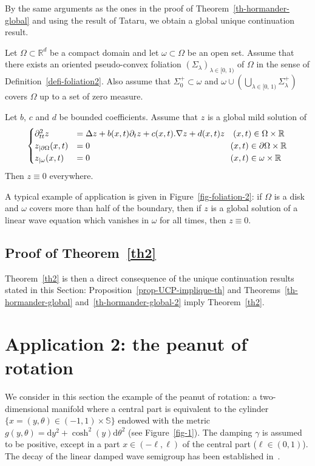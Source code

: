 \documentclass[AHL,Unicode,longabstracts]{cedram}
\newcommand{\RR}{\mathbb{R}}
\renewcommand{\SS}{\mathbb{S}}
\newcommand{\drm}{\mathrm{d}}
\newcommand{\grad}{\nabla}
\begin{document}
By the same arguments as the ones in the proof of Theorem~\ref{th-hormander-global} and using the result of Tataru, we obtain a global unique continuation result.

\begin{theo}\label{th-hormander-global-2}
Let $\Omega\subset\RR^d$ be a compact domain and let $\omega\subset\Omega$ be an open set. Assume that there exists an oriented pseudo-convex foliation $(\Sigma_\lambda)_{\lambda\in[0,\,1)}$ of $\Omega$ in the sense of Definition~\ref{defi-foliation2}. Also assume that $\Sigma_0^+\subset
\omega$ and $\omega\cup\left(\bigcup_{\lambda\in[0,\,1)} \Sigma_\lambda^+\right)$ covers $\Omega$ up to a set of zero measure.

Let $b$, $c$ and $d$ be bounded coefficients. Assume that $z$ is a global mild solution of
\[
\begin{cases}
\partial^2_{tt}z &=\Delta z + b(x,t)\partial_t z+c(x,t).\grad z+d(x,t)z\quad(x,t)\in\Omega\times \RR\\
z_{|\partial\Omega}(x,t)&=0 \mkern298mu (x,t)\in\partial\Omega\times\RR\\
z_{|\omega}(x,t)&=0 \mkern298mu(x,t)\in\omega\times\RR
\end{cases}
\]
Then $z\equiv 0$ everywhere.
\end{theo}

A typical example of application is given in Figure~\ref{fig-foliation-2}: if $\Omega$ is a disk and $\omega$ covers more than half of the boundary, then if $z$ is a global solution of a linear wave equation which vanishes in $\omega$ for all times, then $z\equiv 0$.

\subsection{Proof of Theorem~\ref{th2}}

Theorem~\ref{th2} is then a direct consequence of the unique continuation results stated in this Section: Proposition~\ref{prop-UCP-implique-th} and Theorems~\ref{th-hormander-global} and~\ref{th-hormander-global-2} imply Theorem~\ref{th2}.



\section{Application 2: the peanut of rotation}\label{section-appli2}

We consider in this section the example of the peanut of rotation: a two-dimensional manifold where a central part is equivalent to the cylinder $\{x=(y,\theta)\in (-1,1)\times\!\SS\!\}$ endowed with the metric $g(y,\theta)=\drm y^2+\cosh^2(y)\drm\theta^2$ (see Figure~\ref{fig-1}). The damping $\gamma$ is assumed to be positive, except in a part $x\in (-\ell,\ell)$ of the central part ($\ell\in (0,1)$). The decay of the linear damped wave semigroup has been established in~\cite{CSVW,Schenck}.
\end{document}
